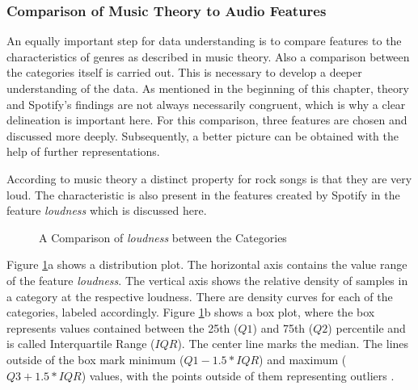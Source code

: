 \subsubsection{Comparison of Music Theory to Audio Features}

An equally important step for data understanding is to compare features to the characteristics of genres
as described in music theory. Also a comparison between the categories itself is carried out.
This is necessary to develop a deeper understanding of the data.
As mentioned in the beginning of this chapter, theory and Spotify's findings are not always necessarily congruent,
which is why a clear delineation is important here.
For this comparison, three features are chosen and discussed more deeply.
Subsequently, a better picture can be obtained with the help of further representations.

According to music theory a distinct property for rock songs is that they are very loud.
The characteristic is also present in the features created by Spotify in the feature \emph{loudness}
which is discussed here.

\begin{figure}[H]
    \centering
    \qquad
    \caption{A Comparison of \emph{loudness} between the Categories}%
    \label{fig:du_dp_bp_ln_categorie_dependent}%
\end{figure}

Figure \ref{fig:du_dp_bp_ln_categorie_dependent}a shows a distribution plot.
The horizontal axis contains the value range of the feature \emph{loudness}.
The vertical axis shows the relative density of samples in a category at the respective loudness.
There are density curves for each of the categories, labeled accordingly.
Figure \ref{fig:du_dp_bp_ln_categorie_dependent}b shows a box plot, where the box represents values contained
between the 25th ($Q1$) and 75th ($Q2$) percentile and is called Interquartile Range ($IQR$).
The center line marks the median.
The lines outside of the box mark minimum ($Q1-1.5*IQR$) and maximum ($Q3+1.5*IQR$) values,
with the points outside of them representing outliers \cite{Galarnyk2018}.

